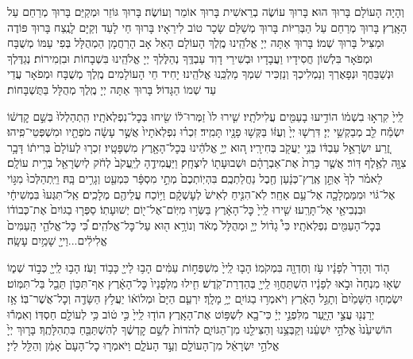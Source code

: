 וְהָיָה הָעוֹלָם בָּרוּךְ הוּא׃
בָּרוּךְ עוֹשֶׂה בְרֵאשִׁית בָּרוּךְ אוֹמֵר וְעוֹשֶׂה׃
בָּרוּךְ גּוֹזֵר וּמְקַיֵּם בָּרוּךְ מְרַחֵם עַל הָאָֽרֶץ׃
בָּרוּךְ מְרַחֵם עַל הַבְּרִיּוֹת בָּרוּךְ מְשַׁלֵּם שָׂכָר טוֹב לִירֵאָיו׃
בָּרוּךְ חַי לָעַד וְקַיָּם לָנֶֽצַח בָּרוּךְ פּוֹדֶה וּמַצִּיל בָּרוּךְ שְׁמוֹ׃
בָּרוּךְ אַתָּה יְיָ אֱלֹהֵֽינוּ מֶֽלֶךְ הָעוֹלָם הָאֵל אָב הָרַחֲמָן הַמְהֻלָּל בְּפִי עַמּוֹ מְשֻׁבָּח וּמְפֹאָר בִּלְשׁוֹן חֲסִידָיו וַעֲבָדָיו וּבְשִׁירֵי דָוִד עַבְדֶּֽךָ נְהַלֶּלְךָ יְיָ אֱלֹהֵֽינוּ בִּשְׁבָחוֹת וּבִזְמִירוֹת׃ נְגַדֶּלְךָ וּנְשַׁבֵּחֲךָ וּנְפָאֶרְךָ וְנַמְלִיכְךָ וְנַזְכִּיר שִׁמְךָ מַלְכֵּֽנוּ אֱלֹהֵֽינוּ׃
יָחִיד חֵי הָעוֹלָמִים מֶֽלֶךְ מְשֻׁבָּח וּמְפֹאָר עֲדֵי עַד שְׁמוֹ הַגָּדוֹל׃ בָּרוּךְ אַתָּה יְיָ מֶֽלֶךְ מְהֻלָּל בַּתֻּשְׁבָּחוֹת׃

לַֽייָ֙ קִרְא֣וּ בִשְׁמ֔וֹ
הוֹדִ֥יעוּ בָעַמִּ֖ים עֲלִילֹתָֽיו׃
שִׁ֤ירוּ לוֹ֙ זַמְּרוּ־ל֔וֹ שִׂ֖יחוּ בְּכׇל־נִפְלְאֹתָֽיו׃
הִֽתְהַלְלוּ֙ בְּשֵׁ֣ם קׇדְשׁ֔וֹ יִשְׂמַ֕ח לֵ֖ב מְבַקְשֵׁ֥י יְיָ׃
דִּרְשׁ֤וּ יְיָ֙ וְעֻזּ֔וֹ בַּקְּשׁ֥וּ פָנָ֖יו תָּמִֽיד׃
זִכְר֗וּ נִפְלְאֹתָיו֙ אֲשֶׁ֣ר עָשָׂ֔ה מֹפְתָ֖יו וּמִשְׁפְּטֵי־פִֽיהוּ׃
זֶ֚רַע יִשְׂרָאֵ֣ל עַבְדּ֔וֹ בְּנֵ֥י יַעֲקֹ֖ב בְּחִירָֽיו׃
ה֚וּא יְיָ֣ אֱלֹהֵ֔ינוּ בְּכׇל־הָאָ֖רֶץ מִשְׁפָּטָֽיו׃
זִכְר֤וּ לְעוֹלָם֙ בְּרִית֔וֹ דָּבָ֥ר צִוָּ֖ה לְאֶ֥לֶף דּֽוֹר׃
אֲשֶׁ֤ר כָּרַת֙ אֶת־אַבְרָהָ֔ם וּשְׁבוּעָת֖וֹ לְיִצְחָֽק׃
וַיַּעֲמִידֶ֤הָ לְיַֽעֲקֹב֙ לְחֹ֔ק לְיִשְׂרָאֵ֖ל בְּרִ֥ית עוֹלָֽם׃
לֵאמֹ֗ר לְךָ֙ אֶתֵּ֣ן אֶֽרֶץ־כְּנָ֔עַן חֶ֖בֶל נַחֲלַתְכֶֽם׃
בִּהְיֽוֹתְכֶם֙ מְתֵ֣י מִסְפָּ֔ר כִּמְעַ֖ט וְגָרִ֥ים בָּֽהּ׃
וַיִּֽתְהַלְּכוּ֙ מִגּ֣וֹי אֶל־גּ֔וֹי וּמִמַּמְלָכָ֖ה אֶל־עַ֥ם אַחֵֽר׃
לֹֽא־הִנִּ֤יחַ לְאִישׁ֙ לְעׇשְׁקָ֔ם וַיּ֥וֹכַח עֲלֵיהֶ֖ם מְלָכִֽים׃
אַֽל־תִּגְּעוּ֙ בִּמְשִׁיחָ֔י וּבִנְבִיאַ֖י אַל־תָּרֵֽעוּ׃
שִׁ֤ירוּ לַֽייָ֙ כׇּל־הָאָ֔רֶץ בַּשְּׂר֥וּ מִיּֽוֹם־אֶל־י֖וֹם יְשׁוּעָתֽוֹ׃
סַפְּר֤וּ בַגּוֹיִם֙ אֶת־כְּבוֹד֔וֹ בְּכׇל־הָעַמִּ֖ים נִפְלְאֹתָֽיו׃
כִּי֩ גָד֨וֹל יְיָ֤ וּמְהֻלָּל֙ מְאֹ֔ד וְנוֹרָ֥א ה֖וּא עַל־כׇּל־אֱלֹהִֽים׃
כִּ֠י כׇּל־אֱלֹהֵ֤י הָֽעַמִּים֙ אֱלִילִ֔ים...וַייָ֖ שָׁמַ֥יִם עָשָֽׂה׃

ה֤וֹד וְהָדָר֙ לְפָנָ֔יו עֹ֥ז וְחֶדְוָ֖ה בִּמְקֹמֽוֹ׃
הָב֤וּ לַֽייָ֙ מִשְׁפְּח֣וֹת עַמִּ֔ים הָב֥וּ לַייָ֖ כָּב֥וֹד וָעֹֽז׃
הָב֥וּ לַֽייָ֖ כְּב֣וֹד שְׁמ֑וֹ שְׂא֤וּ מִנְחָה֙ וּבֹ֣אוּ לְפָנָ֔יו
הִשְׁתַּחֲו֥וּ לַֽייָ֖ בְּהַדְרַת־קֹֽדֶשׁ׃ חִ֤ילוּ מִלְּפָנָיו֙ כׇּל־הָאָ֔רֶץ
אַף־תִּכּ֥וֹן תֵּבֵ֖ל בַּל־תִּמּֽוֹט׃ יִשְׂמְח֤וּ הַשָּׁמַ֙יִם֙ וְתָגֵ֣ל הָאָ֔רֶץ
וְיֹאמְר֥וּ בַגּוֹיִ֖ם יְיָ֥ מָלָֽךְ׃ יִרְעַ֤ם הַיָּם֙ וּמְלוֹא֔וֹ
יַעֲלֹ֥ץ הַשָּׂדֶ֖ה וְכׇל־אֲשֶׁר־בּֽוֹ׃ אָ֥ז יְרַנְּנ֖וּ עֲצֵ֣י הַיָּ֑עַר
מִלִּפְנֵ֣י יְיָ֔ כִּי־בָ֖א לִשְׁפּ֥וֹט אֶת־הָאָֽרֶץ׃ הוֹד֤וּ לַֽייָ֙ כִּ֣י ט֔וֹב
כִּ֥י לְעוֹלָ֖ם חַסְדּֽוֹ׃ וְאִמְר֕וּ הוֹשִׁיעֵ֙נוּ֙ אֱלֹהֵ֣י יִשְׁעֵ֔נוּ
וְקַבְּצֵ֥נוּ וְהַצִּילֵ֖נוּ מִן־הַגּוֹיִ֑ם לְהֹדוֹת֙ לְשֵׁ֣ם קׇדְשֶׁ֔ךָ
לְהִשְׁתַּבֵּ֖חַ בִּתְהִלָּתֶֽךָ׃ בָּר֤וּךְ יְיָ֙ אֱלֹהֵ֣י יִשְׂרָאֵ֔ל
מִן־הָעוֹלָ֖ם וְעַ֣ד הָעֹלָ֑ם וַיֹּאמְר֤וּ כׇל־הָעָם֙ אָמֵ֔ן וְהַלֵּ֖ל לַייָ׃

